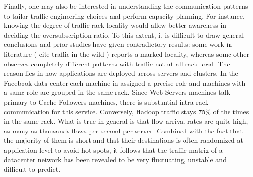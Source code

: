 Finally, one may also be interested in understanding the communication patterns to tailor traffic engineering choices and perform capacity planning. For instance, knowing the degree of traffic rack locality would allow better awareness in deciding the oversubscription ratio. To this extent, it is difficult to draw general conclusions and prior studies have given contradictory results: some work in literature ( cite traffic-in-the-wild ) reports a marked locality, whereas some other observes completely different patterns with traffic not at all rack local. The reason lies in how applications are deployed across servers and clusters. In the Facebook data center each machine in assigned a precise role and machines with a same role are grouped in the same rack. Since Web Servers machines talk primary to Cache Followers machines, there is substantial intra-rack communication for this service. Conversely, Hadoop traffic stays 75\% of the times in the same rack.
What is true in general is that flow arrival rates are quite high, as many as thousands flows per second per server. Combined with the fact that the majority of them is short and that their destinations is often randomized at application level to avoid hot-spots, it follows that the traffic matrix of a datacenter network has been revealed to be very fluctuating, unstable and difficult to predict. 


